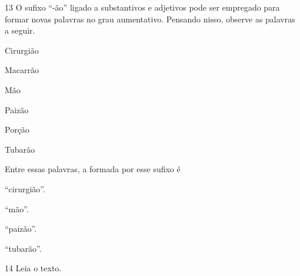 \num{13} O sufixo ``-ão'' ligado a substantivos e adjetivos pode ser
empregado para formar novas palavras no grau aumentativo. Pensando
nisso, observe as palavras a seguir.

\begin{myquote}
\begin{itemize}
\begin{multicols}{3}
\item Cirurgião

\item [] Macarrão

\item [] Mão

\item [] Paizão

\item [] Porção

\item [] Tubarão
\end{multicols}
\end{itemize}
\end{myquote}

Entre essas palavras, a formada por esse sufixo é

\begin{escolha}
\begin{multicols}{2}
\item ``cirurgião''.

\item ``mão''.

\item ``paizão''.

\item ``tubarão''.
\end{multicols}
\end{escolha}


\num{14} Leia o texto.

